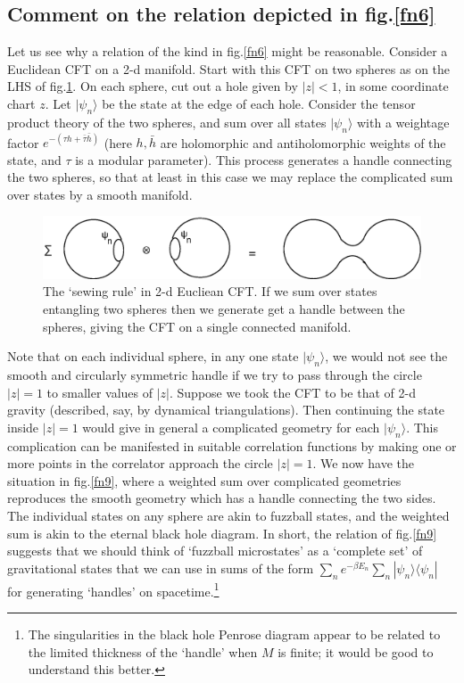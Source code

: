 \documentclass[12pt]{article}
\begin{document}
\subsection{Comment on the relation depicted in fig.\ref{fn6}}

Let us see why a relation of the kind in fig.\ref{fn6} might be reasonable. Consider a Euclidean CFT on a 2-d manifold. Start with this CFT on two spheres as on the LHS of  fig.\ref{fn8}. On each sphere, cut out a hole given by $|z|<1$, in some coordinate chart $z$. Let $|\psi_n\rangle$ be the state at the edge of each hole. Consider the tensor product theory of the two spheres, and sum over all states $|\psi_n\rangle$ with  a weightage factor $e^{-(\tau h+\bar \tau \bar h)}$ (here $h, \bar h$ are holomorphic and antiholomorphic weights of the state, and $\tau$ is a modular parameter). This process generates a handle connecting the two spheres, so that at least in this case we may replace the complicated sum over states by a smooth manifold. 

\begin{figure}[htbp]
\begin{center}
\includegraphics[scale=.75]{fn8.eps}
\caption{{The `sewing rule' in 2-d Eucliean CFT. If we sum over states entangling two spheres  then we generate get a handle between the spheres, giving the CFT on a single connected manifold.}}
\label{fn8}
\end{center}
\end{figure}



Note that on each individual sphere, in any one state $|\psi_n\rangle$, we would not see the smooth and  circularly symmetric handle if we try to pass  through the circle $|z|=1$ to smaller values of $|z|$. Suppose we took the CFT to be that of 2-d gravity (described, say,  by dynamical triangulations). Then continuing the state inside $|z|=1$ would give in general a complicated geometry for each $|\psi_n\rangle$. This complication can be manifested in suitable correlation functions by making one or more points in the correlator approach the circle $|z|=1$. We now have the situation in fig.\ref{fn9}, where a weighted sum over complicated geometries reproduces the smooth geometry which has a handle connecting the two sides. The individual states on any sphere are akin to fuzzball states, and the weighted sum is akin to the eternal black hole diagram. In short, the relation of fig.\ref{fn9} suggests that we should think of `fuzzball microstates' as a  `complete set' of gravitational states that we can use in sums of the form $\sum_n e^{-\beta E_n}\sum_n |\psi_n\rangle\langle \psi_n|$ for generating `handles' on spacetime.\footnote{The singularities in the black hole Penrose diagram appear to be related to the limited thickness of the `handle' when $M$ is finite; it would be good to understand this better.}
\end{document}
